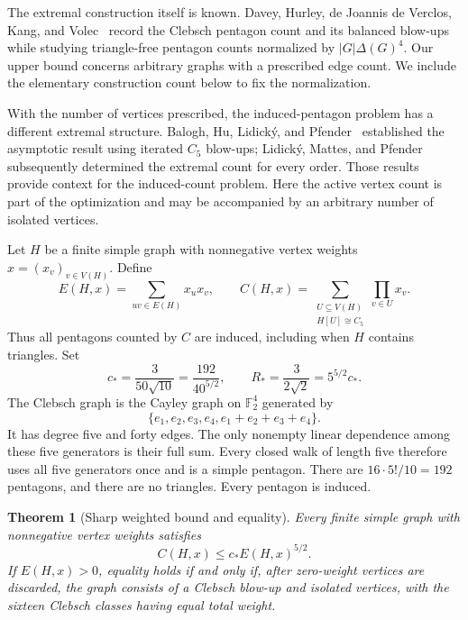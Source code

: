 \documentclass[11pt]{amsart}
\newtheorem{theorem}{Theorem}[section]
\theoremstyle{definition}
\theoremstyle{remark}
\begin{document}
The extremal construction itself is known. Davey, Hurley, de Joannis de
Verclos, Kang, and Volec~\cite[Lemmas~1.4, 7.1, and 7.2]{Davey2026} record
the Clebsch pentagon count and its balanced blow-ups while studying
triangle-free pentagon counts normalized by \(|G|\Delta(G)^4\). Our upper
bound concerns arbitrary graphs with a prescribed edge count. We include
the elementary construction count below to fix the normalization.

With the number of vertices prescribed, the induced-pentagon problem has
a different extremal structure. Balogh, Hu, Lidick\'y, and
Pfender~\cite{Balogh2016} established the asymptotic result using iterated
\(C_5\) blow-ups; Lidick\'y, Mattes, and Pfender~\cite{Lidicky2023}
subsequently determined the extremal count for every order. Those results
provide context for the induced-count problem. Here the active vertex count
is part of the optimization and may be accompanied by an arbitrary number
of isolated vertices.

Let \(H\) be a finite simple graph with nonnegative vertex weights
\(x=(x_v)_{v\in V(H)}\). Define
\[
 E(H,x)=\sum_{uv\in E(H)}x_ux_v,\qquad
 C(H,x)=\sum_{\substack{U\subseteq V(H)\\ H[U]\cong C_5}}
                  \prod_{v\in U}x_v .
\]
Thus all pentagons counted by \(C\) are induced, including when \(H\)
contains triangles. Set
\[
 c_*=\frac{3}{50\sqrt{10}}=\frac{192}{40^{5/2}},
 \qquad
 R_*=\frac{3}{2\sqrt{2}}=5^{5/2}c_*.
\]
The Clebsch graph is the Cayley graph on \(\mathbb F_2^4\) generated by
\[
 \{e_1,e_2,e_3,e_4,e_1+e_2+e_3+e_4\}.
\]
It has degree five and forty edges. The only nonempty linear dependence
among these five generators is their full sum. Every closed walk of length
five therefore uses all five generators once and is a simple pentagon.
There are \(16\cdot 5!/10=192\) pentagons, and there are no triangles.
Every pentagon is induced.

\begin{theorem}[Sharp weighted bound and equality]\label{thm:weighted}
Every finite simple graph with nonnegative vertex weights satisfies
\begin{equation}
 C(H,x)\le c_*E(H,x)^{5/2}.\tag{1}\label{eq:weighted}
\end{equation}
If \(E(H,x)>0\), equality holds if and only if, after zero-weight vertices
are discarded, the graph consists of a Clebsch blow-up and isolated vertices,
with the sixteen Clebsch classes having equal total weight.
\end{theorem}
\end{document}
